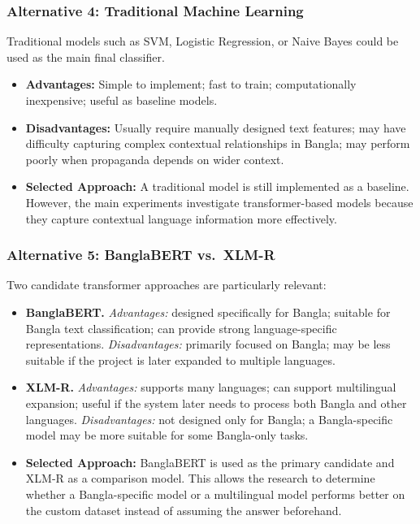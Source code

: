 \documentclass[12pt,a4paper]{report}
\begin{document}
\subsubsection{Alternative 4: Traditional Machine Learning}
Traditional models such as SVM, Logistic Regression, or Naive Bayes could be used as
the main final classifier.
\begin{itemize}
  \item \textbf{Advantages:} Simple to implement; fast to train; computationally
        inexpensive; useful as baseline models.
  \item \textbf{Disadvantages:} Usually require manually designed text features;
        may have difficulty capturing complex contextual relationships in Bangla;
        may perform poorly when propaganda depends on wider context.
  \item \textbf{Selected Approach:} A traditional model is still implemented as a
        baseline. However, the main experiments investigate transformer-based
        models because they capture contextual language information more
        effectively.
\end{itemize}

\subsubsection{Alternative 5: BanglaBERT vs.\ XLM-R}
Two candidate transformer approaches are particularly relevant:
\begin{itemize}
  \item \textbf{BanglaBERT.} \emph{Advantages:} designed specifically for Bangla;
        suitable for Bangla text classification; can provide strong
        language-specific representations. \emph{Disadvantages:} primarily focused
        on Bangla; may be less suitable if the project is later expanded to
        multiple languages.
  \item \textbf{XLM-R.} \emph{Advantages:} supports many languages; can support
        multilingual expansion; useful if the system later needs to process both
        Bangla and other languages. \emph{Disadvantages:} not designed only for
        Bangla; a Bangla-specific model may be more suitable for some Bangla-only
        tasks.
  \item \textbf{Selected Approach:} BanglaBERT is used as the primary candidate and
        XLM-R as a comparison model. This allows the research to determine whether
        a Bangla-specific model or a multilingual model performs better on the
        custom dataset instead of assuming the answer beforehand.
\end{itemize}
\end{document}
